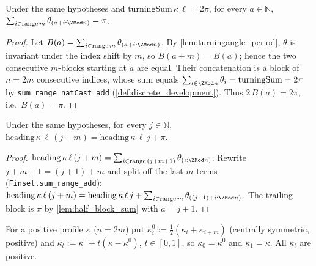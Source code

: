 \begin{lemma}
  \label{lem:half_block_sum}
  Under the same hypotheses and $\mathrm{turningSum}\,\kappa\,\ell = 2\pi$, for
  every $a \in \mathbb{N}$,
  $\sum_{i \in \mathrm{range}\,m} \theta_{(a+i : \ZMod n)} = \pi$.
\end{lemma}
\begin{proof}

\leanok
  Let $B(a) = \sum_{i \in \mathrm{range}\,m}\theta_{(a+i:\ZMod n)}$. By
  \cref{lem:turningangle_period}, $\theta$ is invariant under the index shift by
  $m$, so $B(a+m) = B(a)$; hence the two consecutive $m$-blocks starting at $a$
  are equal. Their concatenation is a block of $n = 2m$ consecutive indices,
  whose sum equals $\sum_{i \in \ZMod n}\theta_i = \mathrm{turningSum} = 2\pi$
  by \texttt{sum\_range\_natCast\_add} (\cref{def:discrete_development}). Thus
  $2\,B(a) = 2\pi$, i.e.\ $B(a) = \pi$.
\end{proof}

\begin{lemma}
  \label{lem:heading_add_half}
  Under the same hypotheses, for every $j \in \mathbb{N}$,
  $\mathrm{heading}\,\kappa\,\ell\,(j+m) = \mathrm{heading}\,\kappa\,\ell\,j + \pi$.
\end{lemma}
\begin{proof}

\leanok
  $\mathrm{heading}\,\kappa\,\ell\,(j+m) = \sum_{i \in \mathrm{range}\,(j+m+1)}
    \theta_{(i:\ZMod n)}$. Rewrite $j+m+1 = (j+1)+m$ and split off the last $m$
  terms (\texttt{Finset.sum\_range\_add}):
  $\mathrm{heading}\,\kappa\,\ell\,(j+m) = \mathrm{heading}\,\kappa\,\ell\,j
    + \sum_{i \in \mathrm{range}\,m}\theta_{((j+1)+i : \ZMod n)}$. The trailing
  block is $\pi$ by \cref{lem:half_block_sum} with $a = j+1$.
\end{proof}

\begin{definition}
  \label{def:central_symmetrization}
  For a positive profile $\kappa$ ($n = 2m$) put
  $\kappa^0_i := \tfrac12(\kappa_i + \kappa_{i+m})$ (centrally symmetric,
  positive) and $\kappa_t := \kappa^0 + t(\kappa - \kappa^0)$, $t \in [0,1]$, so
  $\kappa_0 = \kappa^0$ and $\kappa_1 = \kappa$. All $\kappa_t$ are positive.
\end{definition}

